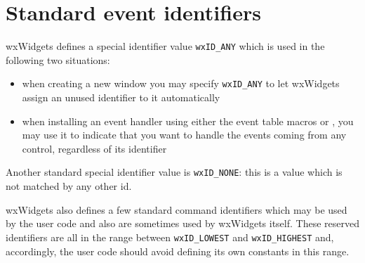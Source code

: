 \section{Standard event identifiers}\label{stdevtid}

wxWidgets defines a special identifier value {\tt wxID\_ANY} which is used in
the following two situations:

\begin{itemize}
\item when creating a new window you may specify {\tt wxID\_ANY} to let
wxWidgets assign an unused identifier to it automatically
\item when installing an event handler using either the event table
macros or ,
you may use it to indicate that you want to handle the events
coming from any control, regardless of its identifier
\end{itemize}

Another standard special identifier value is {\tt wxID\_NONE}: this is a value
which is not matched by any other id.

wxWidgets also defines a few standard command identifiers which may be used by
the user code and also are sometimes used by wxWidgets itself. These reserved
identifiers are all in the range between {\tt wxID\_LOWEST} and 
{\tt wxID\_HIGHEST} and, accordingly, the user code should avoid defining its
own constants in this range.

